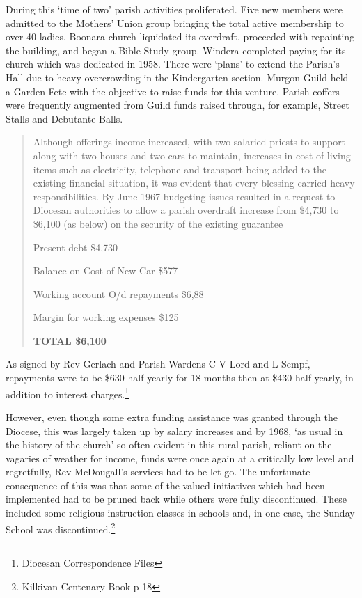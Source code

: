 During this `time of two' parish activities proliferated. Five new
members were admitted to the Mothers' Union group bringing the total
active membership to over 40 ladies. Boonara church liquidated its
overdraft, proceeded with repainting the building, and began a Bible
Study group. Windera completed paying for its church which was dedicated
in 1958. There were `plans' to extend the Parish's Hall due to heavy
overcrowding in the Kindergarten section. Murgon Guild held a Garden
Fete with the objective to raise funds for this venture. Parish coffers
were frequently augmented from Guild funds raised through, for example,
Street Stalls and Debutante Balls.

\begin{quote}
Although offerings income increased, with two salaried priests to
support along with two houses and two cars to maintain, increases in
cost-of-living items such as electricity, telephone and transport being
added to the existing financial situation, it was evident that every
blessing carried heavy responsibilities. By June 1967 budgeting issues
resulted in a request to Diocesan authorities to allow a parish
overdraft increase from \$4,730 to \$6,100 (as below) on the security of
the existing guarantee

Present debt \$4,730

Balance on Cost of New Car \$577

Working account O/d repayments \$6,88

Margin for working expenses \$125

\textbf{TOTAL \$6,100}
\end{quote}

As signed by Rev Gerlach and Parish Wardens C V Lord and L Sempf,
repayments were to be \$630 half-yearly for 18 months then at \$430
half-yearly, in addition to interest charges.\footnote{Diocesan
  Correspondence Files}

However, even though some extra funding assistance was granted through
the Diocese, this was largely taken up by salary increases and by 1968,
`as usual in the history of the church' so often evident in this rural
parish, reliant on the vagaries of weather for income, funds were once
again at a critically low level and regretfully, Rev McDougall's
services had to be let go. The unfortunate consequence of this was that
some of the valued initiatives which had been implemented had to be
pruned back while others were fully discontinued. These included some
religious instruction classes in schools and, in one case, the Sunday
School was discontinued.\footnote{Kilkivan Centenary Book p 18}

